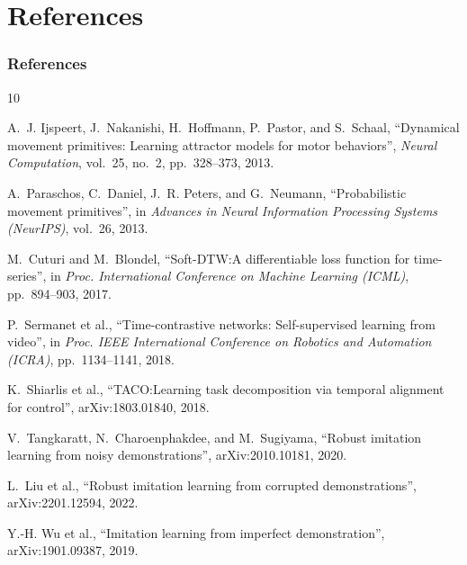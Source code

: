 \documentclass{beamer}
\begin{document}
\section{References}

\begin{frame}[allowframebreaks]
    \frametitle{\textbf{References}}

    \scriptsize
    

    \begin{thebibliography}{10}

        A.~J. Ijspeert, J.~Nakanishi, H.~Hoffmann, P.~Pastor, and S.~Schaal,
        ``Dynamical movement primitives: Learning attractor models for motor behaviors'',
        \emph{Neural Computation}, vol.~25, no.~2, pp.~328--373, 2013.

        A.~Paraschos, C.~Daniel, J.~R. Peters, and G.~Neumann,
        ``Probabilistic movement primitives'',
        in \emph{Advances in Neural Information Processing Systems (NeurIPS)},
        vol.~26, 2013.

        M.~Cuturi and M.~Blondel,
        ``Soft-DTW:\@ A differentiable loss function for time-series'',
        in \emph{Proc. International Conference on Machine Learning (ICML)},
        pp.~894--903, 2017.

        P.~Sermanet et al.,
        ``Time-contrastive networks: Self-supervised learning from video'',
        in \emph{Proc. IEEE International Conference on Robotics and Automation (ICRA)},
        pp.~1134--1141, 2018.

        K.~Shiarlis et al.,
        ``TACO:\@ Learning task decomposition via temporal alignment for control'',
        arXiv:1803.01840, 2018.

        V.~Tangkaratt, N.~Charoenphakdee, and M.~Sugiyama,
        ``Robust imitation learning from noisy demonstrations'',
        arXiv:2010.10181, 2020.

        L.~Liu et al.,
        ``Robust imitation learning from corrupted demonstrations'',
        arXiv:2201.12594, 2022.

        Y.-H. Wu et al.,
        ``Imitation learning from imperfect demonstration'',
        arXiv:1901.09387, 2019.


\end{thebibliography}
\end{frame}
\end{document}
